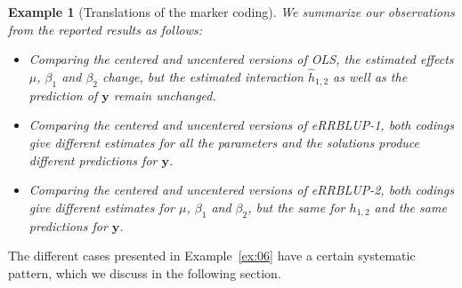 \documentclass{bmcart}
\newtheorem{example}{Example}
\newcommand{\M}{\mathbf{M}}
\newcommand{\0}{\mathbf{0}}
\newcommand{\y}{\mathbf{y}}
\begin{document}
\begin{example}[Translations of the marker coding]
We summarize our observations from the reported results as follows:
\begin{itemize}	
\item Comparing the centered and uncentered versions of OLS, the estimated effects $\mu$, $\beta_1$ and $\beta_2$ change, but the estimated interaction $\hat{h}_{1,2}$ as well as the prediction of ${\mathbf{y}}$ remain unchanged.
\item  Comparing the centered and uncentered versions of eRRBLUP-1, both codings give different estimates for all the parameters and the solutions produce different predictions for ${\mathbf{y}}$.
\item Comparing the centered and uncentered versions of eRRBLUP-2, both codings give different estimates for $\mu$, $\beta_1$ and $\beta_2$, but the same for $h_{1,2}$ and the same predictions for $\y$.
\end{itemize}
\end{example}

The different cases presented in Example~\ref{ex:06} have a certain systematic pattern, which we  discuss in the following section. 


\end{document}
